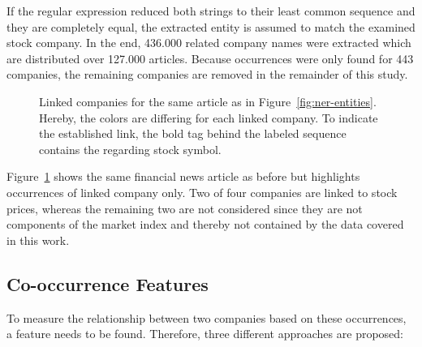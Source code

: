 If the regular expression reduced both strings to their least common sequence and they are completely equal, the extracted entity is assumed to match the examined stock company. In the end, 436.000 related company names were extracted which are distributed over 127.000 articles. Because occurrences were only found for 443 companies, the remaining companies are removed in the remainder of this study.

\begin{figure}
    \centering
    \caption{Linked companies for the same article as in Figure~\ref{fig:ner-entities}. Hereby, the colors are differing for each linked company. To indicate the established link, the bold tag behind the labeled sequence contains the regarding stock symbol.}
    \label{fig:ner-entities-org}
\end{figure}

Figure~\ref{fig:ner-entities-org} shows the same financial news article as before but highlights occurrences of linked company only. Two of four companies are linked to stock prices, whereas the remaining two are not considered since they are not components of the market index and thereby not contained by the data covered in this work.

\subsection{Co-occurrence Features}

To measure the relationship between two companies based on these occurrences, a feature needs to be found. Therefore, three different approaches are proposed:

